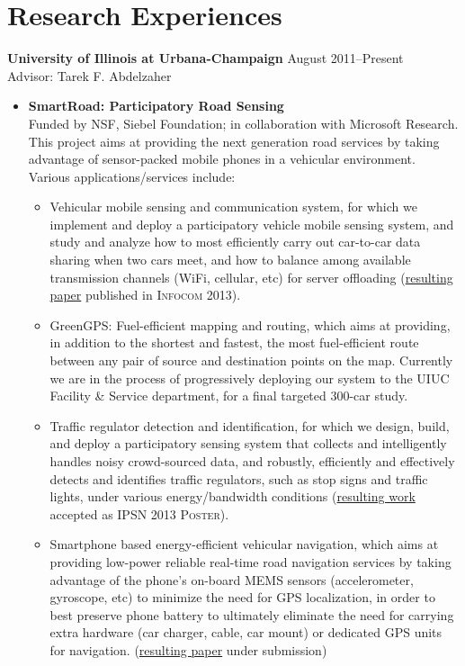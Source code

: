 \section{\sc Research Experiences} {\bf University of Illinois at Urbana-Champaign} \hfill August 2011--Present\\
Advisor: Tarek F. Abdelzaher 
\begin{itemize}
	\item \textbf{SmartRoad: Participatory Road Sensing} \\
	Funded by NSF, Siebel Foundation; in collaboration with Microsoft Research. This project aims at providing the next generation road services by taking advantage of sensor-packed mobile phones in a vehicular environment. Various applications/services include: 
	\begin{itemize}
		\item Vehicular mobile sensing and communication system, for which we implement and deploy a participatory vehicle mobile sensing system, and study and analyze how to most efficiently carry out car-to-car data sharing when two cars meet, and how to balance among available transmission channels (WiFi, cellular, etc) for server offloading (\hyperlink{liu2013infocom}{resulting paper} published in \textsc{Infocom 2013}).
		
		\item GreenGPS: Fuel-efficient mapping and routing, which aims at providing, in addition to the shortest and fastest, the most fuel-efficient route between any pair of source and destination points on the map. Currently we are in the process of progressively deploying our system to the UIUC Facility \& Service department, for a final targeted 300-car study.
		
		\item Traffic regulator detection and identification, for which we design, build, and deploy a participatory sensing system that collects and intelligently handles noisy crowd-sourced data, and robustly, efficiently and effectively detects and identifies traffic regulators, such as stop signs and traffic lights, under various energy/bandwidth conditions (\hyperlink{hu2013ipsn}{resulting work} accepted as \textsc{IPSN 2013 Poster}).
		
		\item Smartphone based energy-efficient vehicular navigation, which aims at providing low-power reliable real-time road navigation services by taking advantage of the phone's on-board MEMS sensors (accelerometer, gyroscope, etc) to minimize the need for GPS localization, in order to best preserve phone battery to ultimately eliminate the need for carrying extra hardware (car charger, cable, car mount) or dedicated GPS units for navigation. (\hyperlink{}{resulting paper} under submission) 
	\end{itemize}
	

\end{itemize}
